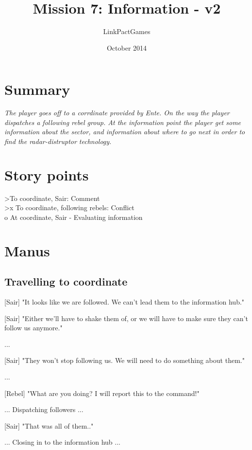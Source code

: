 \documentclass[a4paper,12pt]{article}
\begin{document}
\title{Mission 7: Information - v2}
\author{LinkPactGames}
\date{October 2014}
\maketitle

\section{Summary}

\textit{The player goes off to a corrdinate provided by Ente. On the way the player dispatches a following rebel group.
At the information point the player get some information about the sector, and information about where to go next
in order to find the radar-distruptor technology.}

\section{Story points}

\textgreater To coordinate, Sair: Comment\\
\textgreater x To coordinate, following rebels: Conflict\\
o At coordinate, Sair - Evaluating information

\section{Manus}

\subsection{Travelling to coordinate}

[Sair] "It looks like we are followed. We can't lead them to the information hub." 

[Sair] "Either we'll have to shake them of, or we will have to make sure they can't follow us anymore."

...

[Sair] "They won't stop following us. We will need to do something about them."

...

[Rebel] "What are you doing? I will report this to the command!"

... Dispatching followers ...

[Sair] "That was all of them.."

... Closing in to the information hub ...
\end{document}
